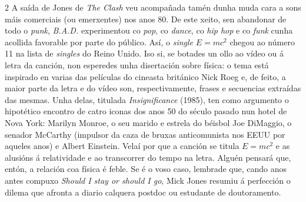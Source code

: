 \begin{multicols}{2}
A saída de Jones de \textit{The Clash} veu acompañada tamén dunha muda cara a
sons máis comerciais (ou emerxentes) nos anos 80. De este xeito, sen abandonar
de todo o \textit{punk}, \textit{B.A.D.} experimentou co \textit{pop}, co
\textit{dance}, co \textit{hip hop} e co \textit{funk} cunha acollida favorable
por parte do público. Así, o \textit{single} $E=mc^2$ chegou ao número 11 na
lista de \textit{singles} do Reino Unido. Iso si, se botades un ollo ao vídeo
ou á letra da canción, non esperedes unha disertación sobre física: o tema está
inspirado en varias das películas do cineasta británico Nick Roeg e, de feito,
a maior parte da letra e do vídeo son, respectivamente, frases e secuencias
extraídas das mesmas. Unha delas, titulada \textit{Insignificance} (1985), ten
como argumento o hipotético encontro de catro iconas dos anos 50 do século
pasado nun hotel de Nova York: Marilyn Monroe, o seu marido e estrela do
béisbol Joe DiMaggio, o senador McCarthy (impulsor da caza de bruxas
anticomunista nos EEUU por aqueles anos) e Albert Einstein. Velaí por que a
canción se titula $E=mc^2$ e as alusións á relatividade e ao transcorrer do
tempo na letra. Alguén pensará que, entón, a relación coa física é feble. Se é
o voso caso, lembrade que, cando anos antes compuxo \textit{Should I stay or
should I go}, Mick Jones resumiu á perfección o dilema que afronta a diario
calquera postdoc ou estudante de doutoramento.

\end{multicols}
